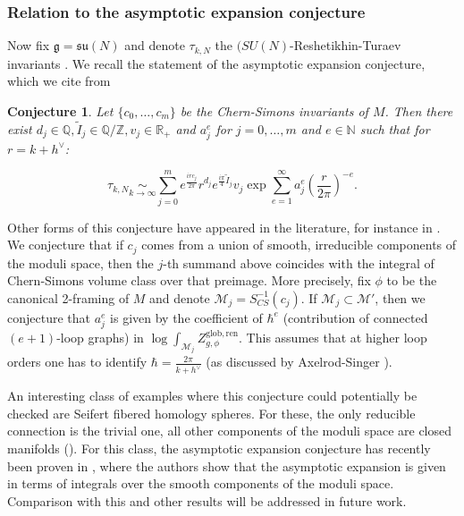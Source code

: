 \documentclass[11pt,a4paper]{amsart}
\theoremstyle{plain} %
\newtheorem{conj}[thm]{Conjecture}
\theoremstyle{definition}
\theoremstyle{remark}
\newcommand{\g}{\mathfrak{g}}
\newcommand{\mr}{\mathrm}
\newcommand{\ra}{\rightarrow}
\newcommand{\M}{\mathcal{M}}
\begin{document}
\subsubsection{Relation to the asymptotic expansion conjecture}
Now fix $\g = \mathfrak{su}(N)$ and denote $\tau_{k,N}$ the $(SU(N)$-Reshetikhin-Turaev invariants \cite{Reshetikhin1991}.
We recall the statement of the asymptotic expansion conjecture, which we cite from \cite[Conjecture 7.7]{Andersen2002}
\begin{conj}
 Let $\{c_0,\ldots,c_m\}$ be the Chern-Simons invariants of $M$. Then there exist  $d_j \in \mathbb{Q}, \tilde{I}_j 
\in \mathbb{Q}/\mathbb{Z}, v_j \in \mathbb{R}_+$ and $a_j^e$ for $j = 0,\ldots,m$ and $e \in \mathbb{N}$ such that for $r = k + h^\vee$:

    \begin{equation} 
        \tau_{k,N} \underset{k\ra\infty}{\sim}\sum_{j=0}^m e^{\frac{i r c_j}{ 2\pi}}r^{d_j}e^{\frac{i \pi}{4} \tilde{I}_j}v_j 
        \exp\sum_{e=1}^\infty a_j^e \left( \frac{r}{2\pi}\right)^{-e}. %
    \end{equation}
\end{conj}
Other forms of this conjecture have appeared in the literature, for instance in  \cite[Section 6]{Reshetikhin2010}. 
We conjecture that if $c_j$ comes from a union of smooth, irreducible components of the moduli space, then the $j$-th summand above coincides with  the integral of Chern-Simons volume class over that preimage. More precisely, fix $\phi$ to be the canonical 2-framing of $M$ and denote $\M_j = S_{CS}^{-1}(c_j)$. If $\M_j \subset \M'$,  then we conjecture that $a_j^e$ is given by the  coefficient of $\hbar^e$ (contribution of connected $(e+1)$-loop graphs) in  $\log\int_{\M_j}Z^\mr{glob,ren}_{g,\phi}$. 
This assumes that at higher loop orders one has to identify $\hbar =
\frac{2\pi}{k + h^\vee}
$ (as discussed by Axelrod-Singer \cite[Section 6]{Axelrod1991}). 


An interesting class of examples where this conjecture could potentially be checked are Seifert fibered homology spheres. For these, the only reducible connection is the trivial one, all other components of the moduli space are closed manifolds (\cite{Fintushel1990}). For this class, the asymptotic expansion conjecture has recently been proven in \cite{Andersen2025}, where the authors show that the asymptotic expansion is given in terms of integrals over the smooth components of the moduli space. Comparison with this and other results will be addressed in future work.
\end{document}
